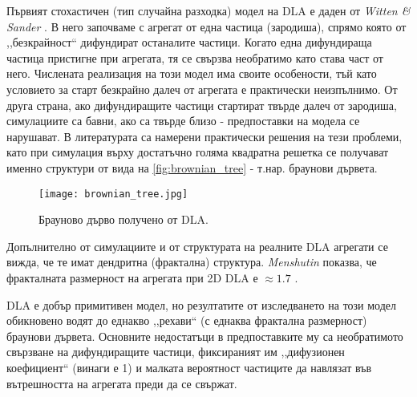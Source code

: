 Първият стохастичен (тип случайна разходка) модел на DLA е даден от \textit{Witten \& Sander} \cite{DLA_Witten}. В него започваме с агрегат от една частица (зародиша), спрямо която от ,,безкрайност`` дифундират останалите частици.
Когато една дифундираща частица пристигне при агрегата, тя се свързва необратимо като става част от него. Числената реализация на този модел има своите особености, тъй като условието за старт безкрайно далеч от агрегата е практически неизпълнимо. От друга страна, ако дифундиращите частици стартират твърде далеч от зародиша, симулациите са бавни, ако са твърде близо - предпоставки на модела се нарушават. В литературата са намерени практически решения на тези проблеми, като при симулация върху достатъчно голяма квадратна решетка се получават именно структури от вида на \autoref{fig:brownian_tree} - т.нар. браунови дървета.
\begin{figure}[hbpt]
    \centering
    \texttt{[image: brownian\_tree.jpg]}
    \caption{Брауново дърво получено от DLA.}
    \label{fig:brownian_tree}
\end{figure}
Допълнително от симулациите и от структурата на реалните DLA агрегати се вижда, че те имат дендритна (фрактална) структура. \textit{Menshutin} показва, че фракталната размерност на агрегата при 2D DLA е $\approx 1.7$ \cite{DLA_Menshutin}. 

DLA е добър примитивен модел, но резултатите от изследването на този модел обикновено водят до еднакво ,,рехави`` (с еднаква фрактална размерност) браунови дървета. Основните недостатъци в предпоставките му са необратимото свързване на дифундиращите частици, фиксираният им ,,дифузионен коефициент`` (винаги е 1) и малката вероятност частиците да навлязат във вътрешността на агрегата преди да се свържат. 

